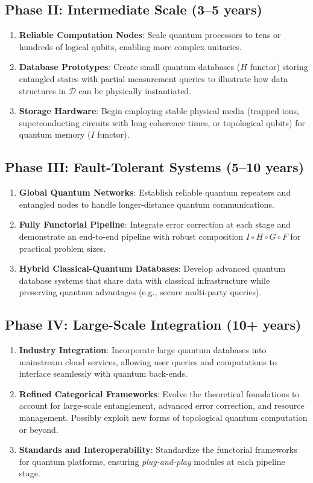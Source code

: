 \documentclass[12pt]{article}
\begin{document}
\subsection*{Phase II: Intermediate Scale (3--5 years)}
\begin{enumerate}
\item \textbf{Reliable Computation Nodes}: Scale quantum processors to tens or hundreds of logical qubits, enabling more complex unitaries.
\item \textbf{Database Prototypes}: Create small quantum databases ($H$ functor) storing entangled states with partial measurement queries to illustrate how data structures in $\mathcal{D}$ can be physically instantiated.
\item \textbf{Storage Hardware}: Begin employing stable physical media (trapped ions, superconducting circuits with long coherence times, or topological qubits) for quantum memory ($I$ functor).
\end{enumerate}

\subsection*{Phase III: Fault-Tolerant Systems (5--10 years)}
\begin{enumerate}
\item \textbf{Global Quantum Networks}: Establish reliable quantum repeaters and entangled nodes to handle longer-distance quantum communications.
\item \textbf{Fully Functorial Pipeline}: Integrate error correction at each stage and demonstrate an end-to-end pipeline with robust composition $I \circ H \circ G \circ F$ for practical problem sizes.
\item \textbf{Hybrid Classical-Quantum Databases}: Develop advanced quantum database systems that share data with classical infrastructure while preserving quantum advantages (e.g., secure multi-party queries).
\end{enumerate}

\subsection*{Phase IV: Large-Scale Integration (10+ years)}
\begin{enumerate}
\item \textbf{Industry Integration}: Incorporate large quantum databases into mainstream cloud services, allowing user queries and computations to interface seamlessly with quantum back-ends.
\item \textbf{Refined Categorical Frameworks}: Evolve the theoretical foundations to account for large-scale entanglement, advanced error correction, and resource management. Possibly exploit new forms of topological quantum computation or beyond.
\item \textbf{Standards and Interoperability}: Standardize the functorial frameworks for quantum platforms, ensuring \emph{plug-and-play} modules at each pipeline stage.
\end{enumerate}
\end{document}
